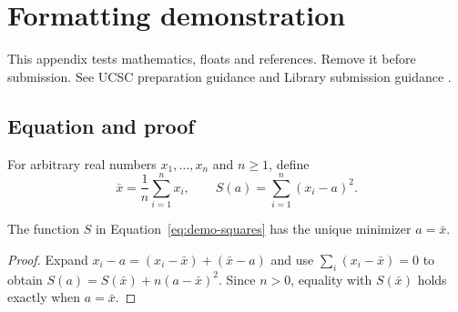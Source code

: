 \chapter{Formatting demonstration}
\label{app:demonstration}
\DemoNotice
This appendix tests mathematics, floats and references. Remove it before
submission. See UCSC preparation guidance \citeyearpar{ucscguide2021} and
Library submission guidance \citeyearpar{ucsclibrary2026}.
\section{Equation and proof}
For arbitrary real numbers $x_1,\ldots,x_n$ and $n\geq1$, define
\begin{equation}
 \bar{x}=\frac{1}{n}\sum_{i=1}^{n}x_i,
 \qquad S(a)=\sum_{i=1}^{n}(x_i-a)^2.
 \label{eq:demo-squares}
\end{equation}
\begin{samepage}
\begin{theorem}
The function $S$ in Equation~\eqref{eq:demo-squares} has the unique minimizer
$a=\bar{x}$.
\end{theorem}
\begin{proof}
Expand $x_i-a=(x_i-\bar{x})+(\bar{x}-a)$ and use
$\sum_i(x_i-\bar{x})=0$ to obtain
$S(a)=S(\bar{x})+n(a-\bar{x})^2$. Since $n>0$, equality with
$S(\bar{x})$ holds exactly when $a=\bar{x}$.
\end{proof}
\end{samepage}
\clearpage

